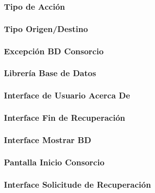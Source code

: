 \documentclass[a4paper,titlepage]{article}
\begin{document}
\subsubsection{Tipo de Acción}

\subsubsection{Tipo Origen/Destino}

\subsubsection{Excepción BD Consorcio}

\subsubsection{Librería Base de Datos}

\subsubsection{Interface de Usuario Acerca De}

\subsubsection{Interface Fin de Recuperación}

\subsubsection{Interface Mostrar BD}

\subsubsection{Pantalla Inicio Consorcio}

\subsubsection{Interface Solicitude de Recuperación}

\end{document}
